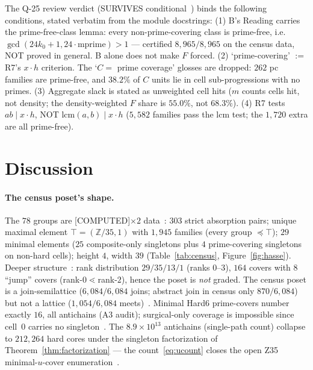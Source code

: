 \documentclass[11pt,a4paper]{article}
\theoremstyle{definition}
\begin{document}
The Q-25 review verdict (SURVIVES conditional~\cite{D322}) binds the
following conditions, stated verbatim from the module docstrings:
(1) B's Reading carries the prime-free-class lemma: every non-prime-covering
class is prime-free, i.e.\ $\gcd(24k_0+1,24\cdot\mathrm{mprime})>1$ ---
certified $8{,}965/8{,}965$ on the census data, NOT proved in general.  B
alone does not make $F$ forced.
(2) `prime-covering' $:=$ R7's $x\cdot h$ criterion.  The `$C=$ prime
coverage' glosses are dropped: $262$ pc families are prime-free, and $38.2\%$
of $C$ units lie in cell sub-progressions with no primes.
(3) Aggregate slack is stated as unweighted cell hits ($m$ counts cells hit,
not density; the density-weighted $F$ share is $55.0\%$, not $68.3\%$).
(4) R7 tests $ab\mid x\cdot h$, NOT $\mathrm{lcm}(a,b)\mid x\cdot h$
($5{,}582$ families pass the lcm test; the $1{,}720$ extra are all
prime-free).

\section{Discussion}

\paragraph{The census poset's shape.}  The $78$ groups are
[COMPUTED]$\times2$ data~\cite{D304}: $303$ strict absorption pairs; unique
maximal element $\top=(\mathbb{Z}/35,1)$ with $1{,}945$ families (every group
$\preceq\top$); $29$ minimal elements ($25$ composite-only singletons plus
$4$ prime-covering singletons on non-hard cells); height $4$, width $39$
(Table~\ref{tab:census}, Figure~\ref{fig:hasse}).  Deeper structure~\cite{D308}:
rank distribution $29/35/13/1$ (ranks $0$--$3$), $164$ covers with $8$
``jump'' covers (rank-$0\lessdot$rank-$2$), hence the poset is \emph{not}
graded.  The census poset is a join-semilattice ($6{,}084/6{,}084$ joins;
abstract join in census only $870/6{,}084$) but not a lattice ($1{,}054/6{,}084$
meets)~\cite{D308}.  Minimal Hard6 prime-covers number exactly $16$, all
antichains (A3 audit); surgical-only coverage is impossible since cell~$0$
carries no singleton~\cite{D308}.  The $8.9\times10^{13}$ antichains
(single-path count) collapse to $212{,}264$ hard cores under the singleton
factorization of Theorem~\ref{thm:factorization} --- the count~\eqref{eq:ucount}
closes the open Z35 minimal-$u$-cover enumeration~\cite{D308,D312}.
\end{document}
